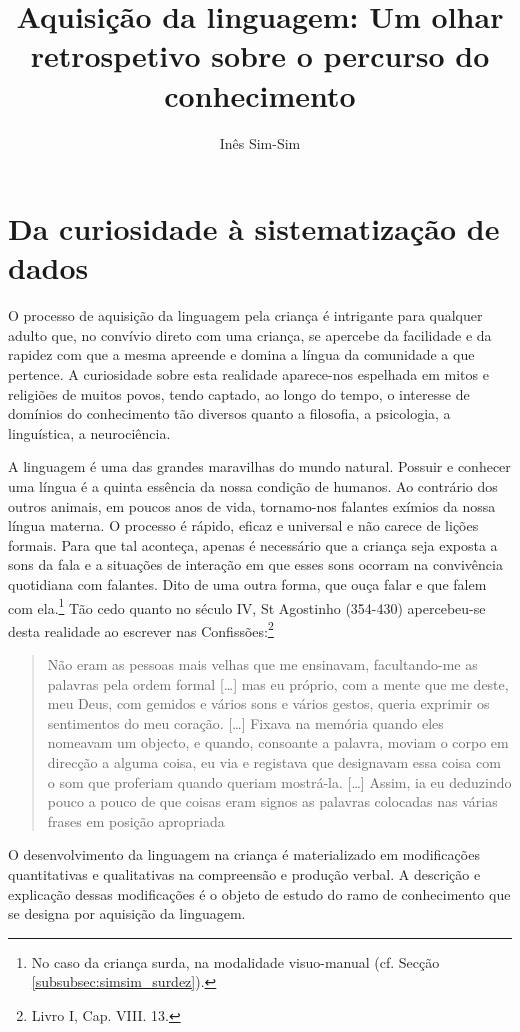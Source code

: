 \documentclass[output=paper]{LSP/langsci}
\author{Inês Sim-Sim\affiliation{Instituto Politécnico de Lisboa} 
}
\title{Aquisição da linguagem: Um olhar retrospetivo sobre o percurso do conhecimento
}
\begin{document}
\section{Da curiosidade à sistematização de dados}
\label{sec:simsim_curiosidade}

O processo de aquisição da linguagem pela criança é intrigante para qualquer adulto que, no convívio direto com uma criança, se apercebe da facilidade e da rapidez com que a mesma apreende e domina a língua da comunidade a que pertence. A curiosidade sobre esta realidade aparece-nos espelhada em mitos e religiões de muitos povos, tendo captado, ao longo do tempo, o interesse de domínios do conhecimento tão diversos quanto a filosofia, a psicologia, a linguística, a neurociência.

A linguagem é uma das grandes maravilhas do mundo natural. Possuir e conhecer uma língua é a quinta essência da nossa condição de humanos. Ao contrário dos outros animais, em poucos anos de vida, tornamo-nos falantes exímios da nossa língua materna. O processo é rápido, eficaz e universal e não carece de lições formais. Para que tal aconteça, apenas é necessário que a criança seja exposta a sons da fala e a situações de interação em que esses sons ocorram na convivência quotidiana com falantes. Dito de uma outra forma, que ouça falar e que falem com ela.\footnote{No caso da criança surda, na modalidade visuo-manual (cf. Secção \ref{subsubsec:simsim_surdez}).} Tão cedo quanto no século IV, St Agostinho (354-430) apercebeu-se desta realidade ao escrever nas Confissões:\footnote{Livro I, Cap. VIII. 13.}

\begin{quote}
Não eram as pessoas mais velhas que me ensinavam, facultando-me as palavras pela ordem formal [\ldots] mas eu próprio, com a mente que me deste, meu Deus, com gemidos e vários sons e vários gestos, queria exprimir os sentimentos do meu coração. [\ldots] Fixava na memória quando eles nomeavam um objecto, e quando, consoante a palavra, moviam o corpo em direcção a alguma coisa, eu via e registava que designavam essa coisa com o som que proferiam quando queriam mostrá-la. [\ldots] Assim, ia eu deduzindo pouco a pouco de que coisas eram signos as palavras colocadas nas várias frases em posição apropriada \citep[23]{stagostinho2000}
\end{quote}

O desenvolvimento da linguagem na criança é materializado em modificações quantitativas e qualitativas na compreensão e produção verbal. A descrição e explicação dessas modificações é o objeto de estudo do ramo de conhecimento que se designa por aquisição da linguagem.
\end{document}
